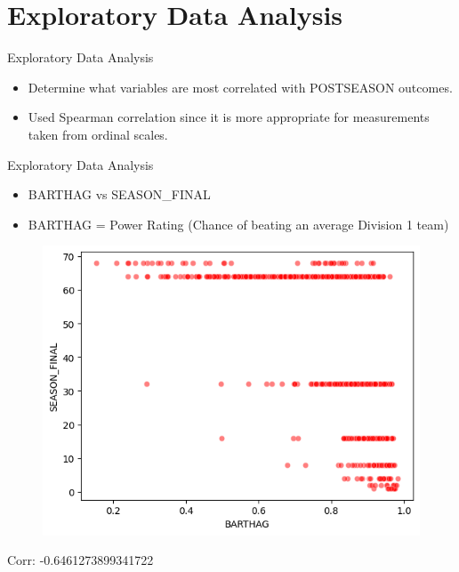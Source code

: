 \documentclass{beamer}
\begin{document}
\section{Exploratory Data Analysis}

\begin{frame}{Exploratory Data Analysis}
\begin{itemize}
  \item Determine what variables are most correlated with POSTSEASON outcomes.
  \item Used Spearman correlation since it is more appropriate for measurements taken from ordinal scales.
\end{itemize}
\end{frame}

\begin{frame}{Exploratory Data Analysis}
  \begin{center}
    \begin{itemize}
        \item BARTHAG vs SEASON\_FINAL
        \item BARTHAG = Power Rating (Chance of beating an average Division 1 team)
    \end{itemize}

    \begin{figure}
      \centering
      \includegraphics[width=0.5\linewidth]{barthagscatterplot.png} %
    \end{figure}

    \vspace{0.1cm}

    Corr: -0.6461273899341722
  \end{center}
\end{frame}
\end{document}
